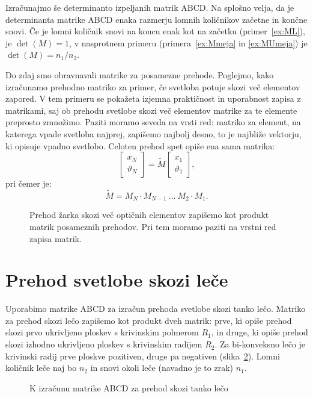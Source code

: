 Izračunajmo še determinanto izpeljanih matrik ABCD. Na splošno velja, da
je determinanta matrike ABCD enaka razmerju lomnih količnikov začetne in 
končne snovi. Če je lomni količnik snovi na koncu enak
kot na začetku (primer~\ref{ex:ML}), je $\det(M) = 1$, v nasprotnem primeru 
(primera~\ref{ex:Mmeja} in \ref{ex:MUmeja}) je $\det(M) = n_1/n_2$.

Do zdaj smo obravnavali matrike za posamezne prehode. Poglejmo, kako izračunamo
prehodno matriko za primer, če svetloba potuje skozi več elementov zapored. V tem
primeru se pokažeta izjemna praktičnost in uporabnost zapisa z matrikami, saj ob prehodu svetlobe skozi 
več elementov matrike za te elemente preprosto zmnožimo. Paziti moramo seveda
na vrsti red: matriko za element, na katerega vpade svetloba najprej, zapišemo
najbolj desno, to je najbliže vektorju, ki opisuje vpadno svetlobo. Celoten prehod
spet opiše ena sama matrika:
\begin{equation}
\left[\begin{array}{c}
x_N\\
\vartheta_N
\end{array}\right] 
= \tilde{M} \left[\begin{array}{c}
x_1\\
\vartheta_1
\end{array}\right]\!\!,
 \label{eq:02_45}
\end{equation}
pri čemer je:
\begin{equation}
\tilde{M} = M_N \cdot M_{N-1}~...~M_2 \cdot M_1.
 \label{eq:02_46}
\end{equation}
\begin{figure}[ht]
\centering
\def\svgwidth{100truemm} 

\caption{Prehod žarka skozi več optičnih elementov zapišemo kot produkt matrik posameznih prehodov.
Pri tem moramo paziti na vrstni red zapisa matrik.}
\label{fig:01_MMM}
\end{figure}

\section{Prehod svetlobe skozi leče}
Uporabimo matrike ABCD za izračun prehoda svetlobe skozi tanko lečo. Matriko
za prehod skozi lečo zapišemo kot produkt dveh matrik: prve, ki opiše
prehod skozi prvo ukrivljeno ploskev s krivinskim polmerom $R_1$, 
in druge, ki opiše prehod skozi izhodno ukrivljeno ploskev s 
krivinskim radijem $R_2$. Za bi-konveksno lečo je krivinski
radij prve ploskve pozitiven, druge pa negativen
(slika~\ref{fig:02_tankaleca}). Lomni količnik leče naj bo $n_2$ in 
snovi okoli leče (navadno je to zrak) $n_1$.
\begin{figure}[!h]
\centering
\def\svgwidth{70truemm} 
%
\caption{K izračunu matrike ABCD za prehod skozi tanko lečo}
\label{fig:02_tankaleca}
\end{figure}

